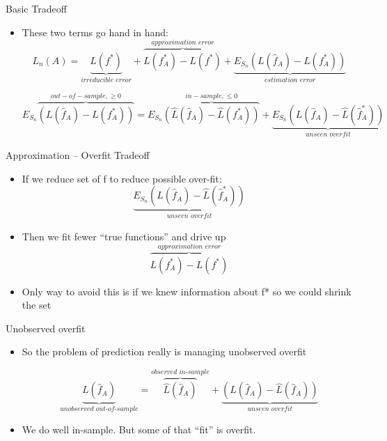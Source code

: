 \documentclass{beamer}
\begin{document}
\begin{frame}{Basic Tradeoff}
	\begin{itemize}
		\item These two terms go hand in hand:
			$$L_n(A)=\underbrace{L(f^\ast)}_{\textit{irreducible error}}+\boxed{\overbrace{L(f^\ast_A)-L(f^\ast)}^{\textit{approximation  error}}}+\underbrace{E_{S_n}(L(\hat{f}_A)-L(f^\ast_A))}_{\textit{estimation error}}$$
		
			$$E_{S_n}\overbrace{(L(\hat{f}_A)-L(f^\ast_A))}^{out-of-sample,\geq 0}=E_{S_n}\overbrace{(\hat{L}(\hat{f}_A)-\hat{L}(f^\ast_A))}^{in-sample,\leq 0 }+\boxed{\underbrace{E_{S_n}(L(\hat{f}_A)-\hat{L}(\hat{f}^\ast_A))}_{\textit{unseen overfit}}}$$
			
	\end{itemize}
\end{frame}

\begin{frame}{Approximation -- Overfit Tradeoff}
	\begin{itemize}
		\item If we reduce set of f to reduce possible over-fit:
		$$\underbrace{E_{S_n}(L(\hat{f}_A)-\hat{L}(\hat{f}^\ast_A))}_{\textit{unseen overfit}}$$
		\item Then we fit fewer “true functions” and drive up
		$$\overbrace{L(f^\ast_A)-L(f^\ast)}^{\textit{approximation error}}$$
		\item Only way to avoid this is if we knew information about f* so we could shrink the set
	\end{itemize}
\end{frame}

\begin{frame}{Unobserved overfit}
	\begin{itemize}
		\item So the problem of prediction really is managing unobserved overfit
		
		$$\underbrace{L(\hat{f}_A)}_{\textit{unobserved out-of-sample}}=\overbrace{\hat{L}(\hat{f}_A)}^{\textit{observed in-sample}}+\underbrace{(L(\hat{f}_A)-\hat{L}(\hat{f}_A))}_{\textit{unseen overfit}}$$
	
		\item We do well in-sample. But some of that “fit” is overfit.
\end{itemize}
\end{frame}
\end{document}
